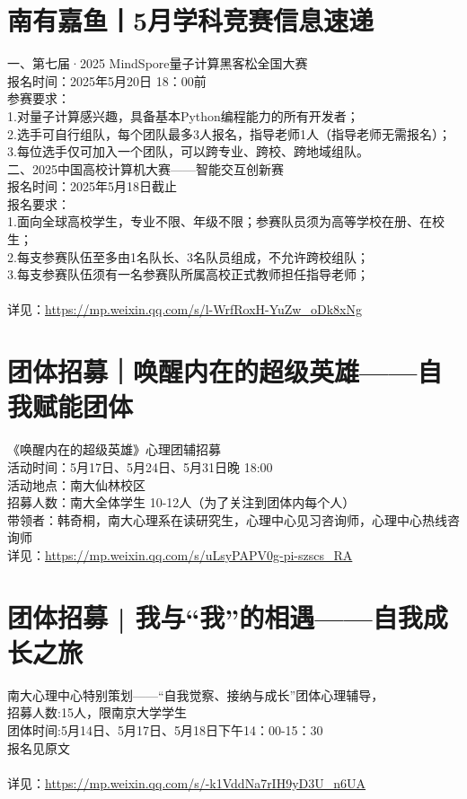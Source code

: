 \documentclass[letterpaper, 12pt]{article}
\begin{document}
\begin{multicols}{2}
\section{南有嘉鱼丨5月学科竞赛信息速递} %
一、第七届·2025 MindSpore量子计算黑客松全国大赛
\\报名时间：2025年5月20日 18：00前
\\参赛要求：
\\1.对量子计算感兴趣，具备基本Python编程能力的所有开发者；
\\2.选手可自行组队，每个团队最多3人报名，指导老师1人（指导老师无需报名）；
\\3.每位选手仅可加入一个团队，可以跨专业、跨校、跨地域组队。
\\二、2025中国高校计算机大赛——智能交互创新赛
\\报名时间：2025年5月18日截止
\\报名要求：
\\1.面向全球高校学生，专业不限、年级不限；参赛队员须为高等学校在册、在校生；
\\2.每支参赛队伍至多由1名队长、3名队员组成，不允许跨校组队；
\\3.每支参赛队伍须有一名参赛队所属高校正式教师担任指导老师；
\\
\\详见：\url{https://mp.weixin.qq.com/s/l-WrfRoxH-YuZw_oDk8xNg}

\section{团体招募｜唤醒内在的超级英雄——自我赋能团体} %
《唤醒内在的超级英雄》心理团辅招募
\\活动时间：5月17日、5月24日、5月31日晚 18:00
\\活动地点：南大仙林校区
\\招募人数：南大全体学生 10-12人（为了关注到团体内每个人）
\\带领者：韩奇桐，南大心理系在读研究生，心理中心见习咨询师，心理中心热线咨询师
\\详见：\url{https://mp.weixin.qq.com/s/uLsyPAPV0g-pi-szscs_RA}

\section{团体招募 | 我与“我”的相遇——自我成长之旅} %
南大心理中心特别策划——“自我觉察、接纳与成长”团体心理辅导，
\\招募人数:15人，限南京大学学生
\\团体时间:5月14日、5月17日、5月18日下午14：00-15：30
\\报名见原文
\\
\\详见：\url{https://mp.weixin.qq.com/s/-k1VddNa7rIH9yD3U_n6UA}


\end{multicols}
\end{document}
